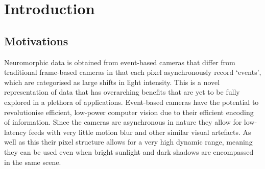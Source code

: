 \chapter{Introduction} \setcounter{page}{1} \label{chap:introduction}

\section{Motivations}

Neuromorphic data is obtained from event-based cameras that differ from traditional frame-based cameras in that each pixel asynchronously record `events', which are categorised as large shifts in light intensity. This is a novel representation of data that has overarching benefits that are yet to be fully explored in a plethora of applications. Event-based cameras have the potential to revolutionise efficient, low-power computer vision due to their efficient encoding of information. Since the cameras are asynchronous in nature they allow for low-latency feeds with very little motion blur and other similar visual artefacts. As well as this their pixel structure allows for a very high dynamic range, meaning they can be used even when bright sunlight and dark shadows are encompassed in the same scene.

